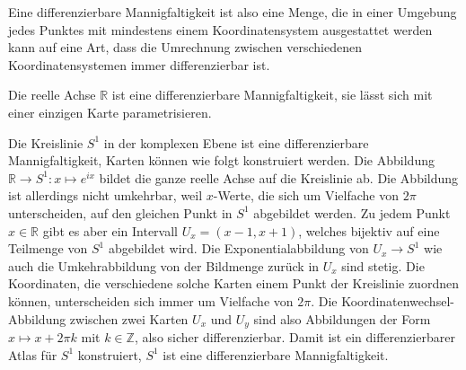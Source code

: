 Eine differenzierbare Mannigfaltigkeit ist also eine Menge, die in
einer Umgebung jedes Punktes mit mindestens einem Koordinatensystem
ausgestattet werden kann auf eine Art, dass die Umrechnung zwischen
verschiedenen Koordinatensystemen immer differenzierbar ist.

\begin{beispiel}
Die reelle Achse $\mathbb{R}$ ist eine differenzierbare Mannigfaltigkeit,
sie lässt sich mit einer einzigen Karte parametrisieren.
\end{beispiel}

\begin{beispiel}
Die Kreislinie $S^1$ in der komplexen Ebene ist eine differenzierbare
Mannigfaltigkeit, Karten können wie folgt konstruiert werden.
Die Abbildung $\mathbb{R}\to S^1: x\mapsto e^{ix}$ bildet die ganze
reelle Achse auf die Kreislinie ab.
Die Abbildung ist allerdings nicht umkehrbar, weil $x$-Werte, die sich
um Vielfache von $2\pi$ unterscheiden, auf den gleichen Punkt in $S^1$
abgebildet werden.
Zu jedem Punkt $x\in\mathbb{R}$ gibt es aber ein Intervall
$U_x=(x-1,x+1)$, welches bijektiv auf eine Teilmenge von $S^1$
abgebildet wird.
Die Exponentialabbildung von $U_x\to S^1$ wie auch die Umkehrabbildung
von der Bildmenge zurück in $U_x$ sind stetig.
Die Koordinaten, die verschiedene solche Karten einem Punkt der Kreislinie
zuordnen können, unterscheiden sich immer um Vielfache von $2\pi$.
Die Koordinatenwechsel-Abbildung zwischen zwei Karten $U_x$ und $U_y$
sind also Abbildungen der Form $x\mapsto x+2\pi k$ mit $k\in\mathbb{Z}$,
also sicher differenzierbar.
Damit ist ein differenzierbarer Atlas für $S^1$ konstruiert, $S^1$
ist eine differenzierbare Mannigfaltigkeit.
\end{beispiel}

